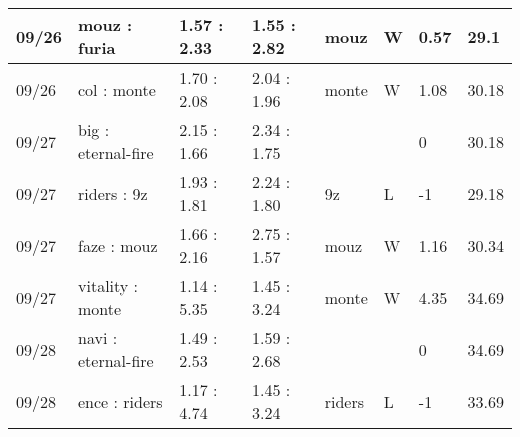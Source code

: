 \begin{small}
\begin{longtable}{|l|l|l|l|l|l|l|l|}
	09/26                               & mouz : furia                        & 1.57 : 2.33                             & 1.55 : 2.82                             & mouz                              & W                                 & 0.57                                 & 29.1                              \\ \hline
	09/26                               & col : monte                         & 1.70 : 2.08                             & 2.04 : 1.96                             & monte                             & W                                 & 1.08                                 & 30.18                             \\ \hline
	09/27                               & big : eternal-fire                  & 2.15 : 1.66                             & 2.34 : 1.75                             &                                   &                                   & 0                                    & 30.18                             \\ \hline
	09/27                               & riders : 9z                         & 1.93 : 1.81                             & 2.24 : 1.80                             & 9z                                & L                                 & -1                                   & 29.18                             \\ \hline
	09/27                               & faze : mouz                         & 1.66 : 2.16                             & 2.75 : 1.57                             & mouz                              & W                                 & 1.16                                 & 30.34                             \\ \hline
	09/27                               & vitality : monte                    & 1.14 : 5.35                             & 1.45 : 3.24                             & monte                             & W                                 & 4.35                                 & 34.69                             \\ \hline
	09/28                               & navi : eternal-fire                 & 1.49 : 2.53                             & 1.59 : 2.68                             &                                   &                                   & 0                                    & 34.69                             \\ \hline
	09/28                               & ence : riders                       & 1.17 : 4.74                             & 1.45 : 3.24                             & riders                            & L                                 & -1                                   & 33.69                             \\ \hline

\end{longtable}
\end{small}
